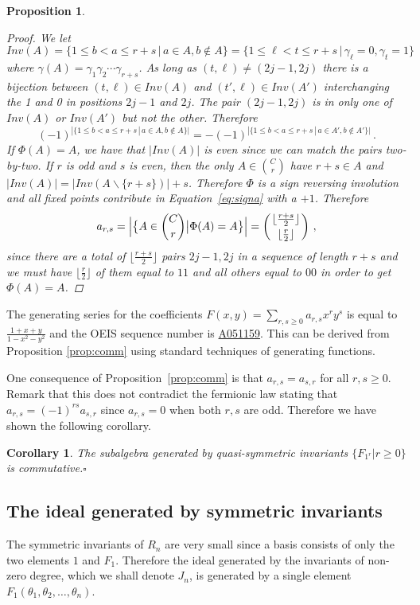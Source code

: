 \documentclass[11pt]{amsart}
\newtheorem{prop}[theorem]{Proposition}
\newtheorem{cor}[theorem]{Corollary}
\theoremstyle{definition}
\numberwithin{equation}{section}
\newcommand{\mike}[1]{\todo[size=\tiny,color=lime!30]{#1 \\ \hfill --- Mike}}
\begin{document}
\begin{prop}
\begin{proof}
We let
 $$Inv(A)=\{1\le b<a\le r+s\,|\,a\in A, b\not\in A\}=\{1\le \ell<t\le r+s\,|\,\gamma_\ell=0,\gamma_t=1 \}\,$$
 where $\gamma(A)=\gamma_1\gamma_2\cdots\gamma_{r+s}$.
As long as $(t,\ell)\ne(2j-1,2j)$ there is a bijection between $(t,\ell)\in Inv(A)$ and
$(t',\ell)\in Inv(A')$ interchanging the 1 and 0 in positions $2j-1$ and $2j$.
The pair $(2j-1,2j)$ is in only one of $Inv(A)$ or $Inv(A')$ but not the other. Therefore
$$(-1)^{|\{1\le b<a\le r+s\,|\,a\in A, b\not\in A\}|} = -(-1)^{|\{1\le b<a\le r+s\,|\,a\in A', b\not\in A'\}|}\,.$$
If $\Phi(A)=A$, we have that $|Inv(A)|$ is even since we can match the pairs two-by-two.
If $r$ is odd and $s$ is even, then the only $A \in \binom{C}{r}$ have
$r+s \in A$ and $|Inv(A)| = |Inv(A \backslash \{ r+s \})| + s$.
Therefore $\Phi$ is a sign reversing involution and all fixed points contribute
in Equation~\eqref{eq:signa} with a $+1$. Therefore
$$a_{r,s}=\Big|\big\{ A\in {C\choose r}\big| \Phi(A)=A\big\}\Big|=\left({\lfloor \frac{r+s}{2} \rfloor \atop \lfloor \frac{r}{2} \rfloor}\right)\,,$$
since there are a total of $\lfloor \frac{r+s}{2} \rfloor$ pairs $2j-1,2j$
in a sequence of length $r+s$ and we must have $\lfloor \frac{r}{2} \rfloor$ of them equal to $11$
and all others equal to $00$ in order to get $\Phi(A)=A$.
\end{proof}
\end{prop}

The generating series for the coefficients $F(x,y) = \sum_{r,s \ge 0} a_{r,s} x^{r}y^{s}$ is
equal to $\frac{1 + x + y}{1 - x^{2} - y^{2}}$
and the OEIS \cite{OEIS} sequence number is \href{https://oeis.org/A051159}{A051159}.
This can be derived from Proposition \ref{prop:comm} using standard techniques of generating functions.
\mike{TODO: add comment to OEIS sequence}

One consequence of Proposition~\ref{prop:comm} is that $a_{r,s}=a_{s,r}$ for all $r,s\ge 0$. Remark that this does not contradict the fermionic law stating that $a_{r,s}=(-1)^{rs}a_{s,r}$ since $a_{r,s}=0$ when both $r,s$ are odd. Therefore we have shown the following corollary.

\begin{cor}
The subalgebra generated by quasi-symmetric invariants $\{F_{1^r}|r\ge 0\}$ is commutative.\hfill$\square$
\end{cor}

\subsection{The ideal generated by symmetric invariants}
The symmetric invariants of $R_n$ are very small since a basis consists of only the two
elements $1$ and $F_1$.  Therefore the ideal generated by the invariants of non-zero
degree, which we shall denote $J_n$, is generated by a single element
$F_1(\theta_1,\theta_2, \ldots, \theta_n)$.
\end{document}
